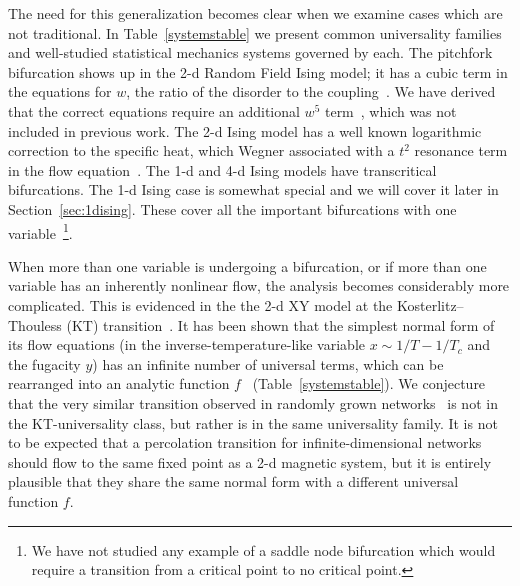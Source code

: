 \documentclass[
 reprint,
 amsmath,amssymb,
 aps, superscriptaddress, pre
]{revtex4-1}
\begin{document}
The need for this generalization becomes clear when we examine cases which are not traditional. In  Table~\ref{systemstable} we present common universality families 
and well-studied statistical mechanics systems governed by each.
The pitchfork bifurcation shows up
in the 2-d Random Field Ising model; it has a cubic term in the equations
for $w$, the ratio of the disorder to the coupling~\cite{Bray85}. We
have derived that the correct equations require an additional $w^5$
term~\cite{Lorien17}, which was not included in previous work. The 2-d
Ising model has a well known logarithmic correction to the specific
heat, which Wegner associated with a $t^2$ resonance term in the flow
equation~\cite{Wegner72}. The 1-d and 4-d Ising models have transcritical
bifurcations. The 1-d Ising case is somewhat special and we will cover it later in Section~\ref{sec:1dising}. These cover all the important bifurcations with one variable~\footnote{We have not studied any example of a saddle node bifurcation which would require a transition from a critical point to no critical point.}.


When more than one variable is undergoing a bifurcation, or if more than one variable has an inherently nonlinear flow, the analysis becomes considerably more complicated. This is evidenced in the the 2-d XY model at the Kosterlitz--Thouless (KT) transition~\cite{kosterlitz1977d}.  It has been shown that the simplest normal form
of its flow equations (in the inverse-temperature-like variable
$x\sim1/T-1/T_c$ and the fugacity $y$) has an infinite number of
universal terms, which can be rearranged into an analytic
function $f$~\cite{pelissetto2013renormalization} (Table~\ref{systemstable}).
We conjecture that the very similar transition observed in randomly grown
networks~\cite{callaway2001randomly,dorogovtsev2001anomalous} is not
in the KT-universality class, but rather is in the same universality
family. It is not to be expected that a percolation transition for
infinite-dimensional networks should flow to the same fixed point
as a 2-d magnetic system, but it is entirely plausible that they share
the same normal form with a different universal function $f$.
\end{document}
